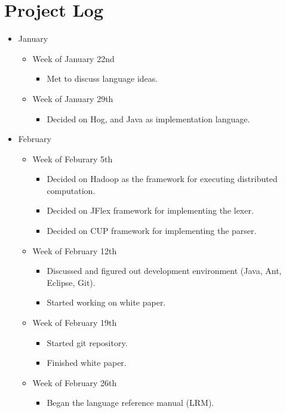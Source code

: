 \documentclass{book}
\begin{document}
\section{Project Log}

\begin{itemize}
\item[] January
\begin{itemize}
\item[] Week of January 22nd
\begin{itemize}
\item Met to discuss language ideas.
\end{itemize}
\item[] Week of January 29th
\begin{itemize}
\item Decided on Hog, and Java as implementation language.
\end{itemize}
\end{itemize}
\item[] February
\begin{itemize}
\item[] Week of Feburary 5th
\begin{itemize}
\item Decided on Hadoop as the framework for executing distributed computation.
\item Decided on JFlex framework for implementing the lexer.
\item Decided on CUP framework for implementing the parser. 
\end{itemize}
\item[] Week of February 12th
\begin{itemize}
\item Discussed and figured out development environment (Java, Ant, Eclipse, Git).
\item Started working on white paper.
\end{itemize}
\item[] Week of February 19th
\begin{itemize}
\item Started git repository.
\item Finished white paper.
\end{itemize}
\item[] Week of February 26th 
\begin{itemize}
\item Began the language reference manual (LRM). 
\end{itemize}
\end{itemize}

\end{itemize}
\end{document}
